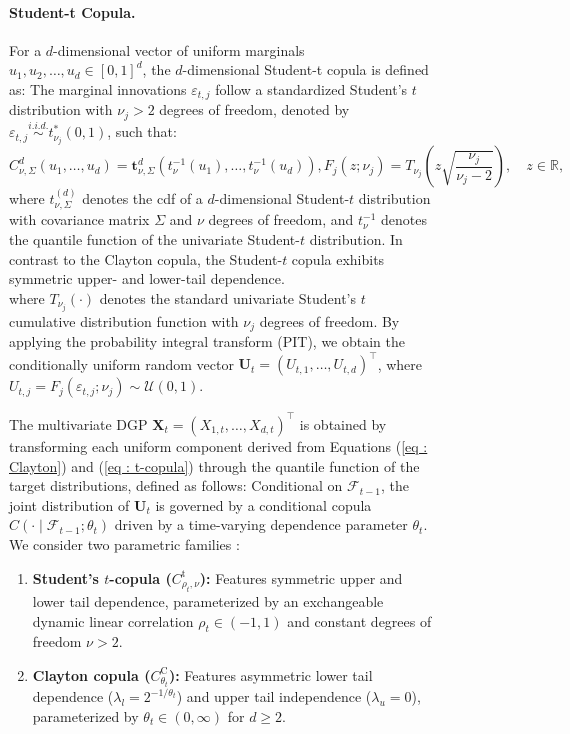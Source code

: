 \documentclass[10pt, a4paper]{article}
\theoremstyle{assumption}
\theoremstyle{definition}
\theoremstyle{theorem}
\begin{document}
\begin{figure}
\paragraph{ Student-t Copula.} 
For a $d$-dimensional vector of uniform marginals $u_1, u_2, \dots, u_d \in [0, 1]^d$, the $d$-dimensional Student-t copula  is defined as:
The marginal innovations $\varepsilon_{t,j}$ follow a standardized Student's $t$ distribution with $\nu_j > 2$ degrees of freedom, denoted by $\varepsilon_{t,j} \stackrel{i.i.d.}{\sim} t_{\nu_j}^*(0, 1)$, such that:
\begin{equation}
    C_{\nu, \Sigma}^d(u_1, \dots, u_d) = \mathbf{t}_{\nu, \Sigma}^d \left( t_\nu^{-1}(u_1), \dots, t_\nu^{-1}(u_d) \right),
    \label{eq : t-copula}
    F_{j}(z; \nu_j) = T_{\nu_j}\left( z \sqrt{\frac{\nu_j}{\nu_j - 2}} \right), \quad z \in \mathbb{R},
\end{equation}
where $t_{\nu,\Sigma}^{(d)}$ denotes the cdf of a $d$-dimensional Student-$t$ distribution with covariance matrix $\Sigma$ and $\nu$ degrees of freedom, and $t_\nu^{-1}$ denotes the quantile function of the univariate Student-$t$ distribution. In contrast to the Clayton copula, the Student-$t$ copula exhibits symmetric upper- and lower-tail dependence. \\
where $T_{\nu_j}(\cdot)$ denotes the standard univariate Student's $t$ cumulative distribution function with $\nu_j$ degrees of freedom. By applying the probability integral transform (PIT), we obtain the conditionally uniform random vector $\boldsymbol{U}_t = (U_{t,1}, \dots, U_{t,d})^\top$, where $U_{t,j} = F_j(\varepsilon_{t,j}; \nu_j) \sim \mathcal{U}(0, 1)$.

The multivariate DGP $\mathbf{X}_t = (X_{1,t}, \dots, X_{d,t})^\top$ is obtained by transforming each uniform component derived from Equations (\ref{eq : Clayton}) and (\ref{eq : t-copula}) through the quantile function of the target distributions, defined as follows:
Conditional on $\mathcal{F}_{t-1}$, the joint distribution of $\boldsymbol{U}_t$ is governed by a conditional copula $C(\cdot \mid \mathcal{F}_{t-1}; \theta_t)$ driven by a time-varying dependence parameter $\theta_t$. We consider two parametric families :
\begin{enumerate}[label=(\roman*)]
    \item \textbf{Student's $t$-copula ($C_{\rho_t, \nu}^{\text{t}}$):} Features symmetric upper and lower tail dependence, parameterized by an exchangeable dynamic linear correlation $\rho_t \in (-1, 1)$ and constant degrees of freedom $\nu > 2$.
    \item \textbf{Clayton copula ($C_{\theta_t}^{\text{C}}$):} Features asymmetric lower tail dependence ($\lambda_l = 2^{-1/\theta_t}$) and upper tail independence ($\lambda_u = 0$), parameterized by $\theta_t \in (0, \infty)$ for $d \ge 2$.
\end{enumerate}


\end{figure}
\end{document}
